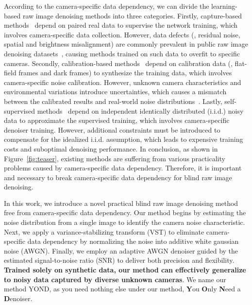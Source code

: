 \documentclass[lettersize,journal]{IEEEtran}
\begin{document}
	According to the camera-specific data dependency, we can divide the learning-based raw image denoising methods into three categories. 
	Firstly, capture-based methods~\cite{CVPR18/SID,TPAMI23/PMN,ICCV23/LED,CVPR23/LLD} depend on paired real data to supervise the network training, which involves camera-specific data collection. However, data defects (\eg, residual noise, spatial and brightness misalignment) are commonly prevalent in public raw image denoising datasets~\cite{CVPR17/DND,CVPR18/SIDD,TPAMI23/PMN,CVPR24/MIDD}, causing methods trained on such data to overfit to specific cameras.
	\IEEEpubidadjcol
	Secondly, calibration-based methods~\cite{P-G,ECCV20/Yuzhi,CVPR20/ELD,TPAMI21/ELD,ICCV21/SFRN,ICME21/RethinkNM} depend on calibration data (\eg, flat-field frames and dark frames) to synthesize the training data, which involves camera-specific noise calibration. 
	However, unknown camera characteristics and environmental variations introduce uncertainties, which causes a mismatch between the calibrated results and real-world noise distributions~\cite{TPAMI23/PMN,ICCV23/LED}. 
	Lastly, self-supervised methods~\cite{ICML18/N2N,CVPR21/FBI,CVPR21/NBR2NBR,CVPR22/B2U,CVPR22/IDR,CVPR23/MIT} depend on independent identically distributed (i.i.d.) noisy data to approximate the supervised training, which involves camera-specific denoiser training. However, additional constraints must be introduced to compensate for the idealized i.i.d. assumption, which leads to expensive training costs and suboptimal denoising performance.
	In conclusion, as shown in Figure~\ref{fig:teaser}, existing methods are suffering from various practicality problems caused by camera-specific data dependency. Therefore, it is important and necessary to break camera-specific data dependency for blind raw image denoising.
	
	In this work, we introduce a novel practical blind raw image denoising method free from camera-specific data dependency. 
	Our method begins by estimating the noise distribution from a single image to identify the camera noise characteristic. Next, we apply a variance-stabilizing transform (VST) to eliminate camera-specific data dependency by normalizing the noise into additive white gaussian noise (AWGN). Finally, we employ an adaptive AWGN denoiser guided by the estimated signal-to-noise ratio (SNR) to deliver both precision and flexibility. \textbf{Trained solely on synthetic data, our method can effectively generalize to noisy data captured by diverse unknown cameras}. We name our method YOND, as you need nothing else under our method, \textbf{Y}ou \textbf{O}nly \textbf{N}eed a \textbf{D}enoiser.
	
\end{document}
